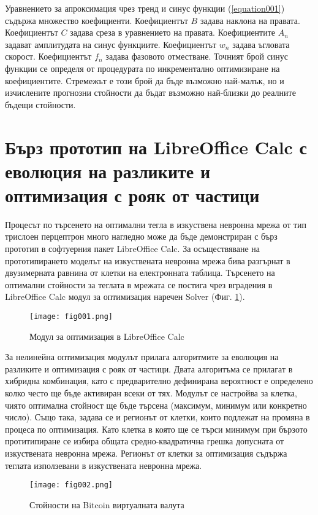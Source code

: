 Уравнението за апроксимация чрез тренд и синус функции (\ref{equation001}) съдържа множество коефициенти. Коефициентът $B$ задава наклона на правата. Коефициентът $C$ задава среза в уравнението на правата. Коефициентите $A_n$ задават амплитудата на синус функциите. Коефициентът $w_n$ задава ъгловата скорост. Коефициентът $f_n$ задава фазовото отместване. Точният брой синус функции се определя от процедурата по инкрементално оптимизиране на коефициентите. Стремежът е този брой да бъде възможно най-малък, но и изчислените прогнозни стойности да бъдат възможно най-близки до реалните бъдещи стойности. 

\section{Бърз прототип на LibreOffice Calc с еволюция на разликите и оптимизация с рояк от частици}

Процесът по търсенето на оптимални тегла в изкуствена невронна мрежа от тип трислоен перцептрон много нагледно може да бъде демонстриран с бърз прототип в софтуерния пакет LibreOffice Calc. За осъществяване на прототипирането моделът на изкуствената невронна мрежа бива разгърнат в двузимерната равнина от клетки на електронната таблица. Търсенето на оптимални стойности за теглата в мрежата се постига чрез вградения в LibreOffice Calc модул за оптимизация наречен Solver (Фиг. \ref{fig001}).

\begin{figure}[h]
  \centering
  \texttt{[image: fig001.png]}
  \caption{Модул за оптимизация в LibreOffice Calc}
\label{fig001}
\end{figure}

За нелинейна оптимизация модулът прилага алгоритмите за еволюция на разликите и оптимизация с рояк от частици. Двата алгоритъма се прилагат в хибридна комбинация, като с предварително дефинирана вероятност е определено колко често ще бъде активиран всеки от тях. Модулът се настройва за клетка, чиято оптимална стойност ще бъде търсена (максимум, минимум или конкретно число). Също така, задава се и регионът от клетки, които подлежат на промяна в процеса по оптимизация. Като клетка в която ще се търси минимум при бързото протитипиране се избира общата средно-квадратична грешка допусната от изкуствената невронна мрежа. Регионът от клетки за оптимизация съдържа теглата използевани в изкуствената невронна мрежа. 

\begin{figure}[h]
  \centering
  \texttt{[image: fig002.png]}
  \caption{Стойности на Bitcoin виртуалната валута}
\label{fig002}
\end{figure}

